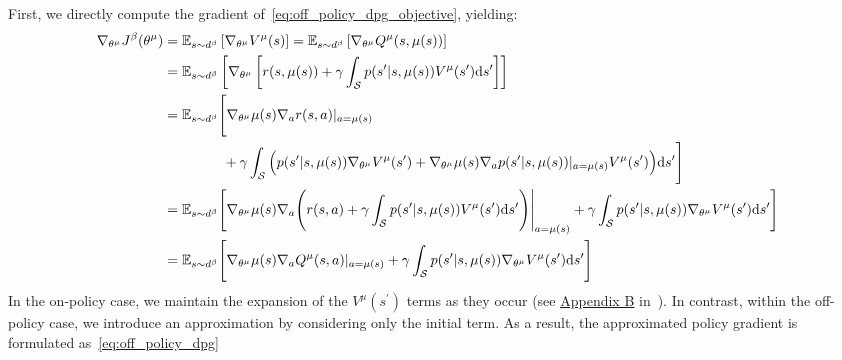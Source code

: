 \documentclass{article}
\begin{document}
\begin{tcolorbox}[breakable,enhanced,colback=gray!10!white,colframe=gray!50!black,
title={Off-Policy Deterministic Policy Gradient (Off-Policy DPG)}]
First, we directly compute the gradient of~\cref{eq:off_policy_dpg_objective}, yielding:
\begin{align*}
    \nabla_{\theta^\mu} J^\beta(\theta^\mu) &= \BBE_{s \sim d^\beta} \left[\nabla_{\theta^\mu} V^\mu(s)\right] = \BBE_{s \sim d^\beta} \left[\nabla_{\theta^\mu} Q^\mu(s, \mu(s))\right]\\
    &=\BBE_{s \sim d^\beta} \left[\nabla_{\theta^\mu} \left[r(s, \mu(s)) + \gamma  \int_\SSS p(s^\prime\vert s, \mu(s)) V^\mu(s^\prime) \rmd s^\prime \right] \right]\\
    &= \BBE_{s \sim d^\beta} \Bigg[\nabla_{\theta^\mu} \mu(s) \nabla_a r(s,a)\vert_{a=\mu(s)} \\
    & \hphantom{=\BBE_{s \sim d^\beta}\Bigg[} + \gamma \int_\SSS\Big(p(s^\prime\vert s, \mu(s))\nabla_{\theta^\mu}V^\mu(s^\prime) + \nabla_{\theta^\mu} \mu(s) \nabla_a p(s^\prime\vert s, \mu(s))\vert_{a=\mu(s)} V^\mu(s^\prime) \Big)\rmd s^\prime \Bigg]\\
    &= \BBE_{s \sim d^\beta} \Bigg[\nabla_{\theta^\mu} \mu(s) \nabla_a \Bigg(r(s,a) + \gamma \int_\SSS p(s^\prime\vert s, \mu(s)) V^\mu(s^\prime)\rmd s^\prime\Bigg)\Bigg\vert_{a=\mu(s)}+ \gamma \int_\SSS p(s^\prime\vert s, \mu(s))\nabla_{\theta^\mu}V^\mu(s^\prime) \rmd s^\prime\Bigg]\\
    &= \BBE_{s \sim d^\beta} \Bigg[\nabla_{\theta^\mu} \mu(s) \nabla_a Q^\mu(s,a)\vert_{a=\mu(s)}+ \gamma \int_\SSS p(s^\prime\vert s, \mu(s))\nabla_{\theta^\mu}V^\mu(s^\prime) \rmd s^\prime\Bigg]
\end{align*}
In the on-policy case, we maintain the expansion of the $V^\mu(s^\prime)$ terms as they occur (see \href{http://proceedings.mlr.press/v32/silver14-supp.pdf}{\underline{Appendix B}} in~\cite{silver2014deterministic}). In contrast, within the off-policy case, we introduce an approximation by considering only the initial term. As a result, the approximated policy gradient is formulated as~\eqref{eq:off_policy_dpg}
\end{tcolorbox}
\end{document}
